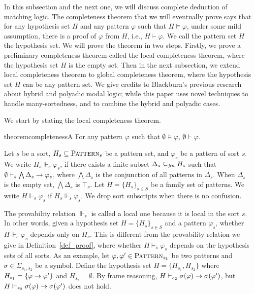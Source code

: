 \documentclass{amsart}
\begin{document}
In this subsection and the next one, we will discuss
complete deduction of matching logic.
The completeness theorem that we will eventually prove
says that 
for any hypothesis set $H$
and any pattern $\varphi$ such that $H \vDash \varphi$,
under some mild assumption,
there is a proof of $\varphi$ from $H$, i.e., 
$H \vdash \varphi$.
We call the pattern set $H$ the hypothesis set.
We will prove the theorem in two steps.
Firstly, we prove a preliminary completeness theorem
called the local completeness theorem, where the hypothesis set $H$ 
is the empty set.
Then in the next subsection, we extend 
local completeness theorem to global completeness theorem,
where the hypothesis set $H$ can be any pattern set.
We give credits to Blackburn's previous research
about hybrid and polyadic modal logic; while this paper
uses novel techniques to handle many-sortedness,
and to combine the hybrid and polyadic cases.

We start by stating the local completeness theorem.

\begin{restatable}{theorem}{completenessA}
\label{thm_completeness_A}
For any pattern $\varphi$ such that $\emptyset \vDash \varphi$, 
$\emptyset \vdash \varphi$.
\end{restatable}




\begin{definition}
Let $s$ be a sort,
$H_s \subseteq \textnormal{\textsc{Pattern}}_s$ be a pattern set,
and $\varphi_s$ be a pattern of sort $s$. 
We write $H_s \Vdash_s \varphi_s$,
if there exists a finite subset $\Delta_s \subseteq_{\mathit{fin}} H_s$ such that
$\emptyset \vdash_s \bigwedge \Delta_s \to \varphi_s$, where $\bigwedge 
\Delta_s$ is the conjunction of all patterns in $\Delta_s$.
When $\Delta_s$ is the empty set, $\bigwedge \Delta_s$ is $\top_s$.
Let $H = \{ H_s \}_{s \in S}$ be a family set of patterns.
We write $H \Vdash_s \varphi_s$ if $H_s \Vdash_s \varphi_s$.
We drop sort subscripts when there is no confusion.
\end{definition}

The provability relation $\Vdash_s$ is called a {local} one
because it is local in the sort $s$.
In other words, given a hypothesis set
$H = \{ H_s \}_{s \in S}$ and a pattern $\varphi_s$,
whether $H \Vdash_s \varphi_s$ depends only on $H_s$.
This is different from the provability relation we give in
Definition~\ref{def_proof}, where
whether $H \vdash_s \varphi_s$ depends on the hypothesis sets of all sorts.
As an example, let $\varphi,\varphi' \in \textnormal{\textsc{Pattern}}_{s_1}$ be two patterns
and $\sigma \in \Sigma_{s_1,s_2}$ be a symbol.
Define the hypothesis set
$H = \{ H_{s_1} , H_{s_2} \}$ where 
$H_{s_1} = \{ \varphi \to \varphi' \}$
and $H_{s_2} = \emptyset$.
By frame reasoning, 
$H \vdash_{s_2} \sigma(\varphi) \to \sigma(\varphi')$,
but
$H \Vdash_{s_2} \sigma(\varphi) \to \sigma(\varphi')$ does not hold.
\end{document}
